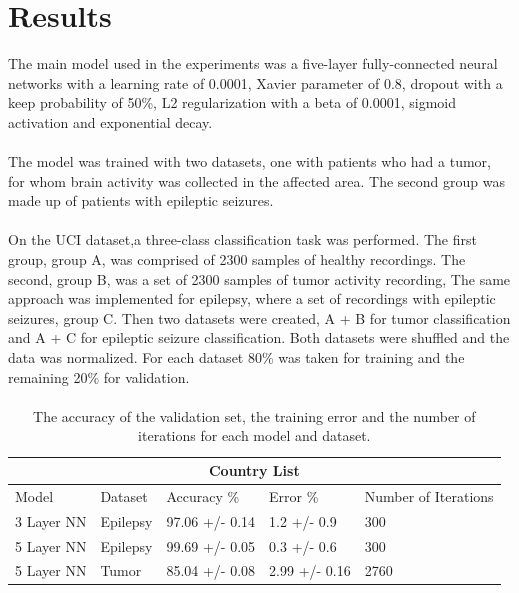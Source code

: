 \documentclass{llncs}       %
\begin{document}
\paragraph{}
\section{Results}
\label{sec:4}
 The main model used in the experiments was a five-layer fully-connected neural networks with a learning rate of 0.0001, Xavier parameter of 0.8, dropout with a keep probability of 50\%, L2 regularization with a beta of 0.0001, sigmoid activation and exponential decay. 

\paragraph{}
The model was trained with two datasets, one with patients who had a tumor, for whom brain activity was collected in the affected area. The second group was made up of  patients with epileptic seizures.
\paragraph{}
On the UCI dataset,a three-class classification task was performed. The first group, group A, was comprised of  2300 samples of healthy recordings. The second, group B, was a set of 2300 samples of tumor activity recording, The same approach was implemented for epilepsy,  where a set of recordings with epileptic seizures, group  C. Then two datasets were created, A + B for tumor classification and A + C for epileptic seizure classification. Both datasets were shuffled and the data was normalized. For each dataset 80\% was taken for training and the remaining 20\% for validation. 

\paragraph{}

\begin{table}[h!]
\begin{tabular}{ |p{3cm}||p{2cm}|p{2cm}|p{2cm}|p{1.5cm}|  }
 \hline
 \multicolumn{5}{|c|}{Country List} \\
 \hline
 Model     & Dataset &Accuracy \%&Error \%& Number of Iterations\\
 \hline
 3 Layer NN & Epilepsy &97.06 +/- 0.14& 1.2 +/- 0.9 &300\\
 5 Layer NN & Epilepsy  & 99.69 +/- 0.05   &0.3 +/- 0.6 &300\\
 5 Layer NN & Tumor & 85.04 +/- 0.08 &  2.99 +/- 0.16 &2760\\
 \hline
\end{tabular}
\caption{ The accuracy of the validation set, the training error and the number of iterations for each model and dataset.}
\end{table}
\end{document}
